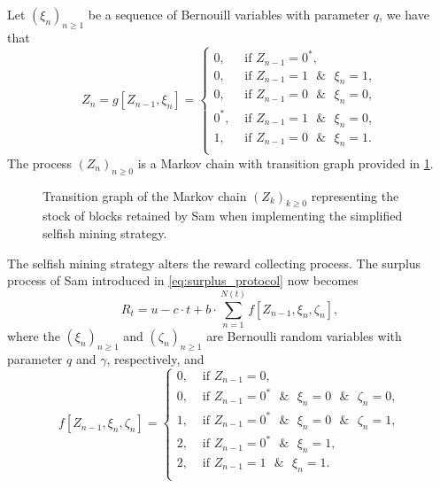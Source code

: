 Let $(\xi_n)_{n\geq1}$ be a sequence of \iid Bernouill variables with parameter $q$, we have that 
\begin{equation}\label{eq:gain_function_selfish}
Z_n = g\left[Z_{n-1},\xi_{n}\right] = \begin{cases}
0,&\text{ if } Z_{n-1} =0^\ast,\\
0,&\text{ if } Z_{n-1} =1\text{ }\&\text{ }\xi_{n} =1,\\
0,&\text{ if } Z_{n-1} =0\text{ }\&\text{ }\xi_{n} =0,\\
0^\ast,&\text{ if } Z_{n-1} =1\text{ }\&\text{ }\xi_{n} =0,\\
1,&\text{ if } Z_{n-1} =0 \text{ }\&\text{ }\xi_{n} = 1.\\
\end{cases}
\end{equation} 
The process $(Z_n)_{n\geq0}$ is a Markov chain with transition graph provided in \cref{fig:transition_graph}.
\begin{figure}[!ht]
\begin{center}
\end{center}
\caption{Transition graph of the Markov chain $(Z_k)_{k\geq0}$ representing the stock of blocks retained by Sam when implementing the simplified selfish mining strategy.}
\label{fig:transition_graph}
\end{figure} 
The selfish mining strategy alters the reward collecting process. The surplus process of Sam introduced in \eqref{eq:surplus_protocol} now becomes 
\begin{equation}\label{eq:surplus_selfish}
R_t = u-c\cdot t+b\cdot\sum_{n = 1}^{N(t)}f\left[Z_{n-1},\xi_n, \zeta_n\right],
\end{equation}
where the $(\xi_n)_{n\ge 1}$ and $(\zeta_n)_{n\ge 1}$ are \iid Bernoulli random variables with parameter $q$ and $\gamma$, respectively, and 
\begin{equation}\label{eq:gain_function_selfish}
f\left[Z_{n-1},\xi_n, \zeta_{n}\right] = \begin{cases}
0,&\text{ if } Z_{n-1} =0,\\
0,&\text{ if } Z_{n-1} =0^\ast\text{ }\&\text{ }\xi_{n} =0\text{ }\&\text{ }\zeta_{n} =0,\\
1,&\text{ if } Z_{n-1} =0^\ast\text{ }\&\text{ }\xi_{n} =0\text{ }\&\text{ }\zeta_{n} =1,\\
2,&\text{ if } Z_{n-1} =0^\ast\text{ }\&\text{ }\xi_{n} =1,\\
2,&\text{ if } Z_{n-1} =1\text{ }\&\text{ }\xi_{n} =1.\\
\end{cases}
\end{equation} 
